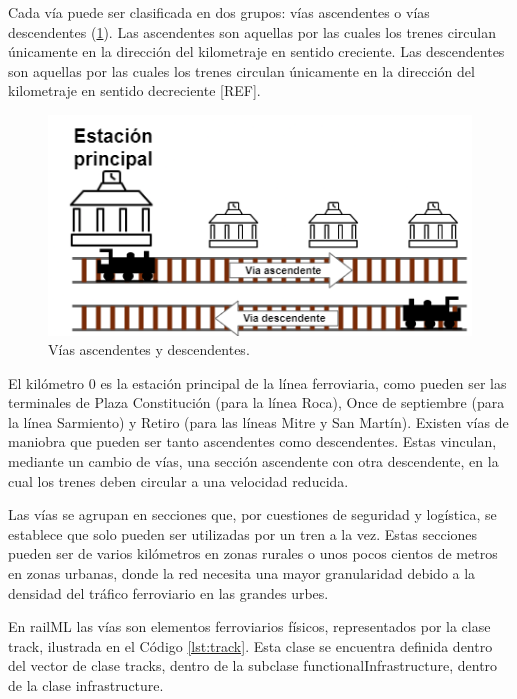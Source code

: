     Cada vía puede ser clasificada en dos grupos: vías ascendentes o vías descendentes (\ref{fig:vias_2}). Las ascendentes son aquellas por las cuales los trenes circulan únicamente en la dirección del kilometraje en sentido creciente. Las descendentes son aquellas por las cuales los trenes circulan únicamente en la dirección del kilometraje en sentido decreciente [REF]. 

    \begin{figure}[!h]
        \centering
        \includegraphics[width=1\textwidth]{Figuras/ascDesc.png}
        \centering\caption{Vías ascendentes y descendentes.}
        \label{fig:vias_2}
    \end{figure}

    El kilómetro 0 es la estación principal de la línea ferroviaria, como pueden ser las terminales de Plaza Constitución (para la línea Roca), Once de septiembre (para la línea Sarmiento) y Retiro (para las líneas Mitre y San Martín).  Existen vías de maniobra que pueden ser tanto ascendentes como descendentes. Estas vinculan, mediante un cambio de vías, una sección ascendente con otra descendente, en la cual los trenes deben circular a una velocidad reducida. 

    Las vías se agrupan en secciones que, por cuestiones de seguridad y logística, se establece que solo pueden ser utilizadas por un tren a la vez. Estas secciones pueden ser de varios kilómetros en zonas rurales o unos pocos cientos de metros en zonas urbanas, donde la red necesita una mayor granularidad debido a la densidad del tráfico ferroviario en las grandes urbes.

    En railML las vías son elementos ferroviarios físicos, representados por la clase track, ilustrada en el Código \ref{lst:track}. Esta clase se encuentra definida dentro del vector de clase tracks, dentro de la subclase functionalInfrastructure, dentro de la clase infrastructure.


